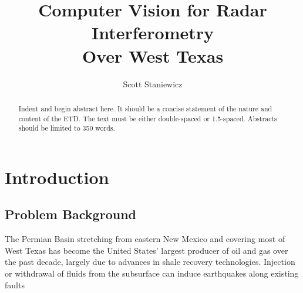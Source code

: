 \documentclass{utexasthesis}
\title{Computer Vision for Radar Interferometry \\ Over West Texas }
\author{Scott Staniewicz}
\begin{document}
\maketitle

\begin{dedication}


\end{dedication}


\begin{acknowledgments}

\end{acknowledgments}

\begin{abstract}
  Indent and begin abstract here. It should be a concise statement of the nature and content of the ETD. The text must be either double-spaced or 1.5-spaced. Abstracts should be limited to 350 words.
\end{abstract}

\maketableofcontents


\chapter{Introduction}





\section{Problem Background}
\label{sec:chap1-problem}


The Permian Basin stretching from eastern New Mexico and covering most of West Texas has become the United States' largest producer of oil and gas over the past decade, largely due to advances in shale recovery technologies. Injection or withdrawal of fluids from the subsurface can induce earthquakes along existing faults
\end{document}

